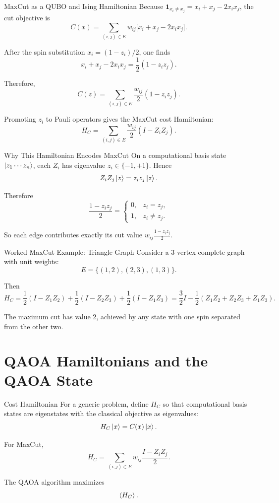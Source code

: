 \documentclass[aspectratio=169]{beamer}
\begin{document}
\begin{frame}{MaxCut as a QUBO and Ising Hamiltonian}
Because \(\mathbf{1}_{x_i\neq x_j} = x_i+x_j-2x_ix_j\), the cut objective is
\[
C(x)
=
\sum_{(i,j)\in E} w_{ij}\bigl[x_i+x_j-2x_i x_j\bigr].
\]

After the spin substitution \(x_i=(1-z_i)/2\), one finds
\[
x_i+x_j-2x_ix_j = \frac{1}{2}(1-z_iz_j).
\]

Therefore,
\[
C(z)
=
\sum_{(i,j)\in E} \frac{w_{ij}}{2}(1-z_iz_j).
\]

Promoting \(z_i\) to Pauli operators gives the MaxCut cost Hamiltonian:
\[
H_C
=
\sum_{(i,j)\in E} \frac{w_{ij}}{2}(I-Z_iZ_j).
\]
\end{frame}

\begin{frame}{Why This Hamiltonian Encodes MaxCut}
On a computational basis state \(\ket{z_1\cdots z_n}\), each \(Z_i\) has
eigenvalue \(z_i\in\{-1,+1\}\). Hence
\[
Z_i Z_j \ket{z} = z_i z_j \ket{z}.
\]

Therefore
\[
\frac{1-z_i z_j}{2}
=
\begin{cases}
0, & z_i=z_j,\\
1, & z_i\neq z_j.
\end{cases}
\]

So each edge contributes exactly its cut value \(w_{ij}\frac{1-z_iz_j}{2}\).
\end{frame}

\begin{frame}{Worked MaxCut Example: Triangle Graph}
Consider a 3-vertex complete graph with unit weights:
\[
E=\{(1,2),(2,3),(1,3)\}.
\]

Then
\[
H_C
=
\frac{1}{2}(I-Z_1Z_2)
+
\frac{1}{2}(I-Z_2Z_3)
+
\frac{1}{2}(I-Z_1Z_3)
=
\frac{3}{2}I - \frac{1}{2}(Z_1Z_2+Z_2Z_3+Z_1Z_3).
\]

The maximum cut has value \(2\), achieved by any state with one spin
separated from the other two.
\end{frame}

\section{QAOA Hamiltonians and the QAOA State}

\begin{frame}{Cost Hamiltonian}
For a generic problem, define \(H_C\) so that computational basis states are
eigenstates with the classical objective as eigenvalues:
\[
H_C\ket{x}=C(x)\ket{x}.
\]

For MaxCut,
\[
H_C = \sum_{(i,j)\in E} w_{ij}\frac{I-Z_iZ_j}{2}.
\]

The QAOA algorithm maximizes
\[
\expval{H_C}.
\]
\end{frame}
\end{document}
